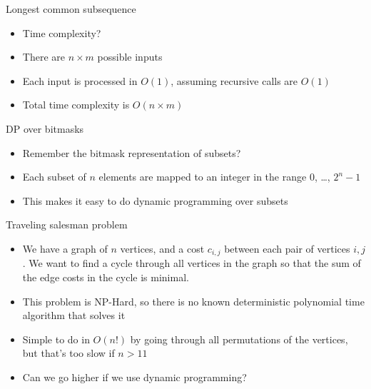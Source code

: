 \begin{frame}[fragile]{Longest common subsequence}
    \begin{itemize}
        \item Time complexity?
        \item There are $n\times m$ possible inputs
        \item Each input is processed in $O(1)$, assuming recursive calls are $O(1)$
        \item Total time complexity is $O(n\times m)$
    \end{itemize}
\end{frame}

\begin{frame}[fragile]{DP over bitmasks}
    \begin{itemize}
        \item Remember the bitmask representation of subsets?
        \item Each subset of $n$ elements are mapped to an integer in the range $0$, \ldots, $2^{n} - 1$
        \item This makes it easy to do dynamic programming over subsets
    \end{itemize}
\end{frame}

\begin{frame}[fragile]{Traveling salesman problem}
    \begin{itemize}
        \item We have a graph of $n$ vertices, and a cost $c_{i,j}$ between each pair of vertices $i, j$. We want to find a cycle through all vertices in the graph so that the sum of the edge costs in the cycle is minimal.
        \item This problem is NP-Hard, so there is no known deterministic polynomial time algorithm that solves it
        \item Simple to do in $O(n!)$ by going through all permutations of the vertices, but that's too slow if $n > 11$
        \item Can we go higher if we use dynamic programming?
    \end{itemize}
\end{frame}

